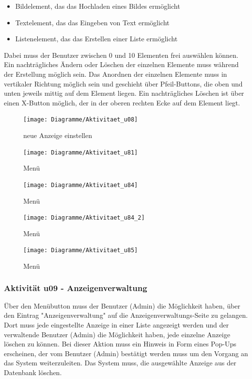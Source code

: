 \documentclass[a4paper,12pt,oneside]{scrartcl}
\begin{document}
\begin{itemize}
	\item Bildelement, das das Hochladen eines Bildes ermöglicht
	\item Textelement, das das Eingeben von Text ermöglicht
	\item Listenelement, das das Erstellen einer Liste ermöglicht
\end{itemize}
Dabei muss der Benutzer zwischen 0 und 10 Elementen frei auswählen können.
Ein nachträgliches Ändern oder Löschen der einzelnen Elemente muss während der Erstellung möglich sein.
Das Anordnen der einzelnen Elemente muss in vertikaler Richtung möglich sein und geschieht über Pfeil-Buttons, die oben und unten jeweils mittig auf dem Element liegen.
Ein nachträgliches Löschen ist über einen X-Button möglich, der in der oberen rechten Ecke auf dem Element liegt.

\begin{figure}[!htbp]
\centering
\noindent\texttt{[image: Diagramme/Aktivitaet\_u08]}
\caption{neue Anzeige einstellen}
\end{figure}
\FloatBarrier

\begin{figure}[!htbp]
\centering
\noindent\texttt{[image: Diagramme/Aktivitaet\_u81]}
\caption{Menü}
\end{figure}
\FloatBarrier

\begin{figure}[!htbp]
\centering
\noindent\texttt{[image: Diagramme/Aktivitaet\_u84]}
\caption{Menü}
\end{figure}
\FloatBarrier

\begin{figure}[!htbp]
\centering
\noindent\texttt{[image: Diagramme/Aktivitaet\_u84\_2]}
\caption{Menü}
\end{figure}
\FloatBarrier

\begin{figure}[!htbp]
\centering
\noindent\texttt{[image: Diagramme/Aktivitaet\_u85]}
\caption{Menü}
\end{figure}
\FloatBarrier

\subsubsection{Aktivität u09 - Anzeigenverwaltung}
Über den Menübutton muss der Benutzer (Admin) die Möglichkeit haben, über den Eintrag "Anzeigenverwaltung" auf die Anzeigenverwaltungs-Seite zu gelangen. 
Dort muss jede eingestellte Anzeige in einer Liste angezeigt werden und der verwaltende Benutzer (Admin) die Möglichkeit haben, jede einzelne Anzeige löschen zu können. 
Bei dieser Aktion muss ein Hinweis in Form eines Pop-Ups erscheinen, der vom Benutzer (Admin) bestätigt werden muss um den Vorgang an das System weiterzuleiten. 
Das System muss, die ausgewählte Anzeige aus der Datenbank löschen.
\end{document}
